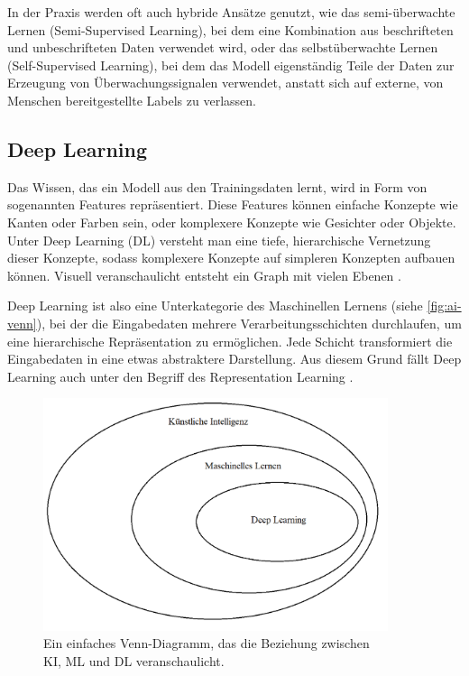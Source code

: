 In der Praxis werden oft auch hybride Ansätze genutzt, wie das semi-überwachte Lernen (Semi-Supervised Learning), bei dem eine Kombination aus beschrifteten und unbeschrifteten Daten verwendet wird, oder das selbstüberwachte Lernen (Self-Supervised Learning), bei dem das Modell eigenständig Teile der Daten zur Erzeugung von Überwachungssignalen verwendet, anstatt sich auf externe, von Menschen bereitgestellte Labels zu verlassen.

\subsection{Deep Learning} \label{subsec:deep-learning}

Das Wissen, das ein Modell aus den Trainingsdaten lernt, wird in Form von sogenannten Features repräsentiert. Diese Features können einfache Konzepte wie Kanten oder Farben sein, oder komplexere Konzepte wie Gesichter oder Objekte. Unter Deep Learning (DL) versteht man eine tiefe, hierarchische Vernetzung dieser Konzepte, sodass komplexere Konzepte auf simpleren Konzepten aufbauen können. Visuell veranschaulicht entsteht ein Graph mit vielen Ebenen \parencite{Goodfellow2016deeplearning}.

Deep Learning ist also eine Unterkategorie des Maschinellen Lernens (siehe \autoref{fig:ai-venn}), bei der die Eingabedaten mehrere Verarbeitungsschichten durchlaufen, um eine hierarchische Repräsentation zu ermöglichen. Jede Schicht transformiert die Eingabedaten in eine etwas abstraktere Darstellung. Aus diesem Grund fällt Deep Learning auch unter den Begriff des Representation Learning \parencite{Zhou2021machinelearning}.

\begin{figure}[t]
	\centering
	\includegraphics[width=0.9\textwidth]{images/figure_ai_venn-diagram.png}
	\caption{Ein einfaches Venn-Diagramm, das die Beziehung zwischen\\KI, ML und DL veranschaulicht.}
	\label{fig:ai-venn}
\end{figure}

